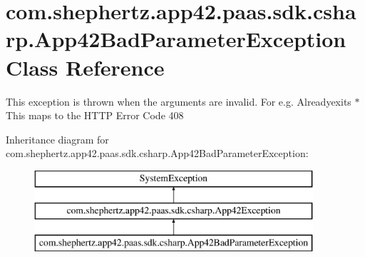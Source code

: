 \hypertarget{classcom_1_1shephertz_1_1app42_1_1paas_1_1sdk_1_1csharp_1_1_app42_bad_parameter_exception}{\section{com.\+shephertz.\+app42.\+paas.\+sdk.\+csharp.\+App42\+Bad\+Parameter\+Exception Class Reference}
\label{classcom_1_1shephertz_1_1app42_1_1paas_1_1sdk_1_1csharp_1_1_app42_bad_parameter_exception}
}


This exception is thrown when the arguments are invalid. For e.\+g. Alreadyexits $\ast$ This maps to the H\+T\+T\+P Error Code 408  


Inheritance diagram for com.\+shephertz.\+app42.\+paas.\+sdk.\+csharp.\+App42\+Bad\+Parameter\+Exception\+:\begin{figure}[H]
\begin{center}
\leavevmode
\includegraphics[height=3.000000cm]{classcom_1_1shephertz_1_1app42_1_1paas_1_1sdk_1_1csharp_1_1_app42_bad_parameter_exception}
\end{center}
\end{figure}
